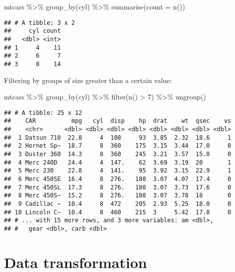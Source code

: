 \documentclass[
]{book}
\newenvironment{Shaded}{\begin{snugshade}}{\end{snugshade}}
\newcommand{\AttributeTok}[1]{\textcolor[rgb]{0.77,0.63,0.00}{#1}}
\newcommand{\DecValTok}[1]{\textcolor[rgb]{0.00,0.00,0.81}{#1}}
\newcommand{\FunctionTok}[1]{\textcolor[rgb]{0.00,0.00,0.00}{#1}}
\newcommand{\NormalTok}[1]{#1}
\newcommand{\SpecialCharTok}[1]{\textcolor[rgb]{0.00,0.00,0.00}{#1}}
\begin{document}
\begin{Shaded}
\begin{Highlighting}[]
\NormalTok{mtcars }\SpecialCharTok{\%\textgreater{}\%} \FunctionTok{group\_by}\NormalTok{(cyl) }\SpecialCharTok{\%\textgreater{}\%} \FunctionTok{summarise}\NormalTok{(}\AttributeTok{count =} \FunctionTok{n}\NormalTok{())}
\end{Highlighting}
\end{Shaded}

\begin{verbatim}
## # A tibble: 3 x 2
##     cyl count
##   <dbl> <int>
## 1     4    11
## 2     6     7
## 3     8    14
\end{verbatim}

Filtering by groups of size greater than a certain value:

\begin{Shaded}
\begin{Highlighting}[]
\NormalTok{mtcars }\SpecialCharTok{\%\textgreater{}\%} \FunctionTok{group\_by}\NormalTok{(cyl) }\SpecialCharTok{\%\textgreater{}\%} \FunctionTok{filter}\NormalTok{(}\FunctionTok{n}\NormalTok{() }\SpecialCharTok{\textgreater{}} \DecValTok{7}\NormalTok{) }\SpecialCharTok{\%\textgreater{}\%} \FunctionTok{ungroup}\NormalTok{()}
\end{Highlighting}
\end{Shaded}

\begin{verbatim}
## # A tibble: 25 x 12
##    CAR          mpg   cyl  disp    hp  drat    wt  qsec    vs
##    <chr>      <dbl> <dbl> <dbl> <dbl> <dbl> <dbl> <dbl> <dbl>
##  1 Datsun 710  22.8     4  108     93  3.85  2.32  18.6     1
##  2 Hornet Sp~  18.7     8  360    175  3.15  3.44  17.0     0
##  3 Duster 360  14.3     8  360    245  3.21  3.57  15.8     0
##  4 Merc 240D   24.4     4  147.    62  3.69  3.19  20       1
##  5 Merc 230    22.8     4  141.    95  3.92  3.15  22.9     1
##  6 Merc 450SE  16.4     8  276.   180  3.07  4.07  17.4     0
##  7 Merc 450SL  17.3     8  276.   180  3.07  3.73  17.6     0
##  8 Merc 450S~  15.2     8  276.   180  3.07  3.78  18       0
##  9 Cadillac ~  10.4     8  472    205  2.93  5.25  18.0     0
## 10 Lincoln C~  10.4     8  460    215  3     5.42  17.8     0
## # ... with 15 more rows, and 3 more variables: am <dbl>,
## #   gear <dbl>, carb <dbl>
\end{verbatim}

\hypertarget{data-transformation}{%
\section{Data transformation}\label{data-transformation}}
\end{document}
